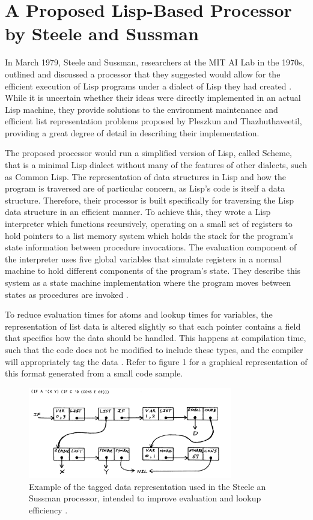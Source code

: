 \documentclass[journal]{IEEEtran}
\begin{document}
\section{A Proposed Lisp-Based Processor by Steele and Sussman}
In March 1979, Steele and Sussman, researchers at the MIT AI Lab in the 1970s, outlined and discussed a processor that they suggested would allow for the efficient execution of Lisp programs under a dialect of Lisp they had created \cite{ss}. While it is uncertain whether their ideas were directly implemented in an actual Lisp machine, they provide solutions to the environment maintenance and efficient list representation problems proposed by Pleszkun and Thazhuthaveetil, providing a great degree of detail in describing their implementation.

The proposed processor would run a simplified version of Lisp, called Scheme, that is a minimal Lisp dialect without many of the features of other dialects, such as Common Lisp. The representation of data structures in Lisp and how the program is traversed are of particular concern, as Lisp's code is itself a data structure. Therefore, their processor is built specifically for traversing the Lisp data structure in an efficient manner. To achieve this, they wrote a Lisp interpreter which functions recursively, operating on a small set of registers to hold pointers to a list memory system which holds the stack for the program's state information between procedure invocations. The evaluation component of the interpreter uses five global variables that simulate registers in a normal machine to hold different components of the program's state. They describe this system as a state machine implementation where the program moves between states as procedures are invoked \cite{ss}.

To reduce evaluation times for atoms and lookup times for variables, the representation of list data is altered slightly so that each pointer contains a field that specifies how the data should be handled. This happens at compilation time, such that the code does not be modified to include these types, and the compiler will appropriately tag the data \cite{ss}. Refer to figure 1 for a graphical representation of this format generated from a small code sample.


\begin{figure}[!t]
	\centering
	\includegraphics[width=3.5in]{SS_Data_Representation}
	\caption{Example of the tagged data representation used in the Steele an Sussman processor, intended to improve evaluation and lookup efficiency \cite{ss}.}
	\label{Data representation}
\end{figure}
\end{document}
